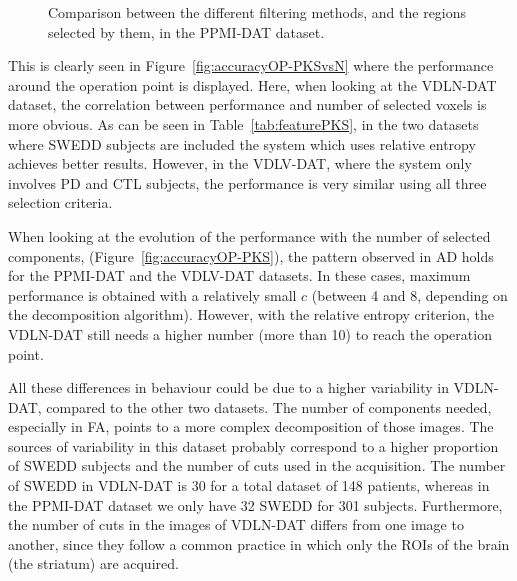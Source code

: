 \begin{figure}[bth]
	\caption[Comparison between the different filtering methods in PPMI-DAT.]{Comparison between the different filtering methods, and the regions selected by them, in the PPMI-DAT dataset. }\label{fig:comparisonSelection_ppmidat}
\end{figure}

This is clearly seen in Figure~\ref{fig:accuracyOP-PKSvsN} where the performance around the operation point is displayed. Here, when looking at the VDLN-DAT dataset, the correlation between performance and number of selected voxels is more obvious. As can be seen in Table~\ref{tab:featurePKS}, in the two datasets where \ac{SWEDD} subjects are included the system which uses relative entropy achieves better results. However, in the VDLV-DAT, where the system only involves \ac{PD} and \ac{CTL} subjects, the performance is very similar using all three selection criteria. 

When looking at the evolution of the performance with the number of selected components, (Figure~\ref{fig:accuracyOP-PKS}), the pattern observed in \ac{AD} holds for the PPMI-DAT and the VDLV-DAT datasets. In these cases, maximum performance is obtained with a relatively small $c$ (between 4 and 8, depending on the decomposition algorithm). However, with the relative entropy criterion, the VDLN-DAT still needs a higher number (more than 10) to reach the operation point. 

All these differences in behaviour could be due to a higher variability in VDLN-DAT, compared to the other two datasets. The number of components needed, especially in \ac{FA}, points to a more complex decomposition of those images. The sources of variability in this dataset probably correspond to a higher proportion of \ac{SWEDD} subjects and the number of cuts used in the acquisition. The number of \ac{SWEDD} in VDLN-DAT is 30 for a total dataset of 148 patients, whereas in the PPMI-DAT dataset we only have 32 \ac{SWEDD} for 301 subjects. Furthermore, the number of cuts in the images of VDLN-DAT differs from one image to another, since they follow a common practice in which only the \acp{ROI} of the brain (the striatum) are acquired. 
